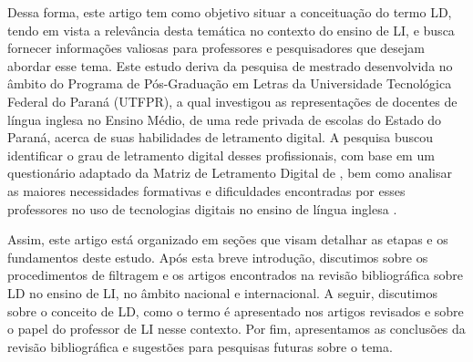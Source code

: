 Dessa forma, este artigo tem como objetivo situar a conceituação do
termo LD, tendo em vista a relevância desta temática no contexto do
ensino de LI, e busca fornecer informações valiosas para professores e
pesquisadores que desejam abordar esse tema. Este estudo deriva da
pesquisa de mestrado desenvolvida no âmbito do Programa de Pós-Graduação
em Letras da Universidade Tecnológica Federal do Paraná (UTFPR), a
qual investigou as representações de docentes de língua inglesa no
Ensino Médio, de uma rede privada de escolas do Estado do Paraná, acerca
de suas habilidades de letramento digital. A pesquisa buscou identificar
o grau de letramento digital desses profissionais, com base em um
questionário adaptado da Matriz de Letramento Digital de \textcite{dias2009matriz}, bem como analisar as maiores necessidades formativas e
dificuldades encontradas por esses professores no uso de tecnologias
digitais no ensino de língua inglesa \cite{farias2024letramento}.

Assim, este artigo está organizado em seções que visam detalhar as
etapas e os fundamentos deste estudo. Após esta breve introdução,
discutimos sobre os procedimentos de filtragem e os artigos encontrados
na revisão bibliográfica sobre LD no ensino de LI, no âmbito nacional e
internacional. A seguir, discutimos sobre o conceito de LD, como o termo
é apresentado nos artigos revisados e sobre o papel do professor de LI
nesse contexto. Por fim, apresentamos as conclusões da revisão
bibliográfica e sugestões para pesquisas futuras sobre o tema.
